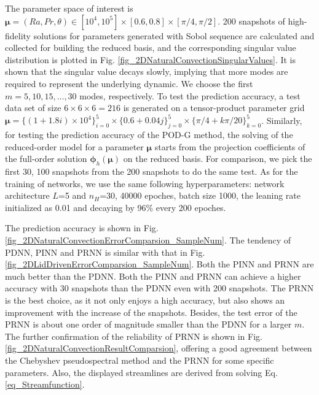 \documentclass[preprint, 10pt]{elsarticle}
\begin{document}
The parameter space of interest is $\pmb{\mu}=(Ra, Pr, \theta) \in [10^4, 10^5] \times [0.6, 0.8] \times[\pi/4, \pi/2]$. 200 snapshots of high-fidelity solutions for parameters generated with Sobol sequence are calculated and collected for building the reduced basis, and the corresponding singular value distribution is plotted in Fig. \ref{fig_2DNaturalConvectionSingularValues}. It is shown that the singular value decays slowly, implying that more modes are required to represent the underlying dynamic. We choose the first $m=5, 10, 15,...,30$ modes, respectively.
To test the prediction accuracy, a test data set of size $6 \times 6 \times 6=216$ is generated on a tensor-product parameter grid $\pmb{\mu}=\{(1+ 1.8i)\times 10^4\}_{i=0}^{5} \times \{0.6+ 0.04j\}_{j=0}^{5} \times \{\pi/4+ k\pi/20\}_{k=0}^{5}$.
Similarly, for testing the prediction accuracy of the POD-G method, the solving of the reduced-order model for a parameter $\pmb{\mu}$ starts from the projection coefficients of the full-order solution $\pmb{\phi}_h \left( \pmb{\mu} \right)$ on the reduced basis.
For comparison, we pick the first 30, 100 snapshots from the 200 snapshots to do the same test. As for the training of networks, we use the same following hyperparameters: network architecture $L$=5 and $n_H$=30, 40000 epoches, batch size 1000, the leaning rate initialized as 0.01 and decaying by 96\% every 200 epoches.

The prediction accuracy is shown in Fig. \ref{fig_2DNaturalConvectionErrorComparsion_SampleNum}. The tendency of PDNN, PINN and PRNN is similar with that in Fig. \ref{fig_2DLidDrivenErrorComparsion_SampleNum}. Both the PINN and PRNN are much better than the PDNN.  Both the PINN and PRNN can achieve a higher accuracy with 30 snapshots than the PDNN even with 200 snapshots. The PRNN is the best choice, as it not only enjoys a high accuracy, but also shows an improvement with the increase of the snapshots. Besides, the test error of the PRNN is about one order of magnitude smaller than the PDNN for a larger $m$.
The further confirmation of the reliability of PRNN is shown in Fig. \ref{fig_2DNaturalConvectionResultComparsion}, offering a good agreement between the Chebyshev pseudospectral method and the PRNN for some specific parameters. Also, the displayed streamlines are derived from solving Eq. \ref{eq_Streamfunction}.

\end{document}
